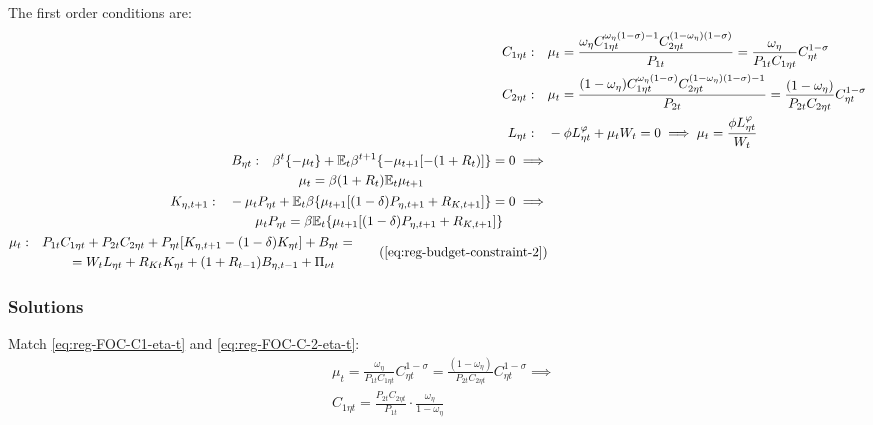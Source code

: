 \documentclass[
thesis.tex
]{subfiles}
\begin{document}
The first order conditions are:
\begin{align}
	C_{1\eta t}: \quad & \mu_t = \frac{\omega_{\eta} C_{1\eta t}^{\omega_{\eta} (1 -\sigma) -1} C_{2\eta t}^{(1 -\omega_{\eta})(1 -\sigma)}}{P_{1t}} = \frac{\omega_{\eta}}{P_{1t} C_{1\eta t}} C_{\eta t}^{1 -\sigma} \label{eq:reg-FOC-C1-eta-t} 
	\\
	C_{2\eta t}: \quad & \mu_t = \frac{(1 -\omega_{\eta}) C_{1\eta t}^{\omega_{\eta} (1 -\sigma)} C_{2\eta t}^{(1 -\omega_{\eta})(1 -\sigma)-1}}{P_{2t}} = \frac{(1 -\omega_{\eta})}{P_{2t} C_{2\eta t}} C_{\eta t}^{1 -\sigma} \label{eq:reg-FOC-C-2-eta-t} 
	\\
	L_{\eta t}: \quad & -\phi L_{\eta t}^{\varphi} +\mu_t W_t = 0 \implies \mu_t = \frac{\phi L_{\eta t}^{\varphi}}{W_t} \label{eq:reg-household-FOC-Lt} 
	\\
	\begin{split}
		B_{\eta t}: \quad & \beta^t \{-\mu_t\} + \E \beta^{t+1} \{ -\mu_{t+1} [-(1 + R_{t})] \} = 0 \implies \\ & \qquad \mu_t = \beta (1 + R_{t}) \E{ \mu_{t+1} }
	\end{split} \label{eq:reg-FOC-Bt}
	\\
	\begin{split}
		K_{\eta, t+1}: \quad & -\mu_t P_{\eta t} + \mathbb{E}_t \beta \{ \mu_{t+1} [(1-\delta) P_{\eta, t+1} + R_{K,t+1}] \} = 0 \implies \\ & \qquad \mu_t P_{\eta t} = \beta \mathbb{E}_t \{ \mu_{t+1} [(1-\delta) P_{\eta, t+1} + R_{K,t+1}] \}
	\end{split} \label{eq:reg-household-FOC-Kt} \\
	\begin{split}
		\mu_t: \quad & P_{1t} C_{1\eta t} + P_{2t} C_{2\eta t} + P_{\eta t} [ K_{\eta, t+1} - (1-\delta)K_{\eta t} ] + B_{\eta t} = \\ & \qquad = W_t L_{\eta t} + R_{Kt} K_{\eta t} + (1 + R_{t-1}) B_{\eta,t-1} + \Pi_{\nu t}
	\end{split} \tag{\ref{eq:reg-budget-constraint-2}}
\end{align}

\subsubsection*{Solutions}

Match \ref{eq:reg-FOC-C1-eta-t} and \ref{eq:reg-FOC-C-2-eta-t}:
\begin{align}
	& \mu_t = \frac{\omega_{\eta}}{P_{1t} C_{1\eta t}} C_{\eta t}^{1 -\sigma} = \frac{(1 -\omega_{\eta})}{P_{2t} C_{2\eta t}} C_{\eta t}^{1 -\sigma} \implies \nonumber \\
	& C_{1\eta t} = \frac{P_{2t} C_{2\eta t}}{P_{1t}} \cdot \frac{\omega_{\eta}}{1 -\omega_{\eta}} \label{eq:reg-FOC-C1-C2}
\end{align}
\end{document}
